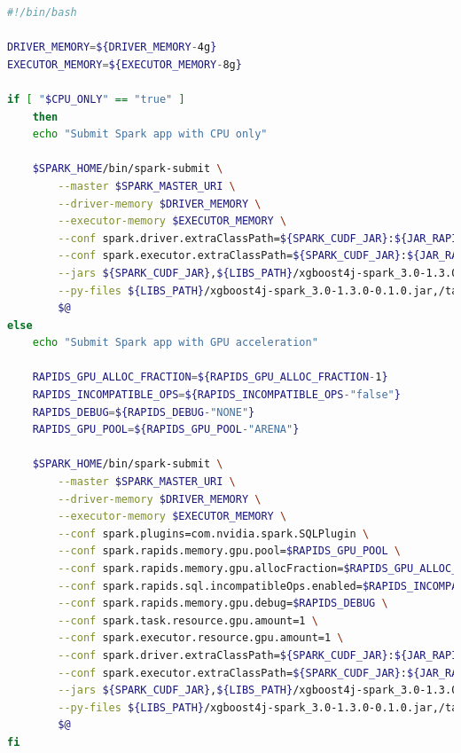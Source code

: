 \begin{lstlisting}[label=lst:appendix_spark-submit_script, caption=Custom submit script, language=sh]
#!/bin/bash
 
DRIVER_MEMORY=${DRIVER_MEMORY-4g}
EXECUTOR_MEMORY=${EXECUTOR_MEMORY-8g}
 
if [ "$CPU_ONLY" == "true" ]
    then
    echo "Submit Spark app with CPU only"
 
    $SPARK_HOME/bin/spark-submit \
        --master $SPARK_MASTER_URI \
        --driver-memory $DRIVER_MEMORY \
        --executor-memory $EXECUTOR_MEMORY \
        --conf spark.driver.extraClassPath=${SPARK_CUDF_JAR}:${JAR_RAPIDS}:${LIBS_PATH}/xgboost4j_3.0-1.3.0-0.1.0.jar:${LIBS_PATH}/xgboost4j-spark_3.0-1.3.0-0.1.0.jar \
        --conf spark.executor.extraClassPath=${SPARK_CUDF_JAR}:${JAR_RAPIDS}:${LIBS_PATH}/xgboost4j_3.0-1.3.0-0.1.0.jar:${LIBS_PATH}/xgboost4j-spark_3.0-1.3.0-0.1.0.jar \
        --jars ${SPARK_CUDF_JAR},${LIBS_PATH}/xgboost4j-spark_3.0-1.3.0-0.1.0.jar,${LIBS_PATH}/xgboost4j_3.0-1.3.0-0.1.0.jar,${JAR_RAPIDS} \
        --py-files ${LIBS_PATH}/xgboost4j-spark_3.0-1.3.0-0.1.0.jar,/tank/data/users/chh-ms/spark-xgboost-examples/examples/apps/python/samples.zip \
        $@
else
    echo "Submit Spark app with GPU acceleration"
 
    RAPIDS_GPU_ALLOC_FRACTION=${RAPIDS_GPU_ALLOC_FRACTION-1}
    RAPIDS_INCOMPATIBLE_OPS=${RAPIDS_INCOMPATIBLE_OPS-"false"}
    RAPIDS_DEBUG=${RAPIDS_DEBUG-"NONE"}
    RAPIDS_GPU_POOL=${RAPIDS_GPU_POOL-"ARENA"}
 
    $SPARK_HOME/bin/spark-submit \
        --master $SPARK_MASTER_URI \
        --driver-memory $DRIVER_MEMORY \
        --executor-memory $EXECUTOR_MEMORY \
        --conf spark.plugins=com.nvidia.spark.SQLPlugin \
        --conf spark.rapids.memory.gpu.pool=$RAPIDS_GPU_POOL \
        --conf spark.rapids.memory.gpu.allocFraction=$RAPIDS_GPU_ALLOC_FRACTION \
        --conf spark.rapids.sql.incompatibleOps.enabled=$RAPIDS_INCOMPATIBLE_OPS \
        --conf spark.rapids.memory.gpu.debug=$RAPIDS_DEBUG \
        --conf spark.task.resource.gpu.amount=1 \
        --conf spark.executor.resource.gpu.amount=1 \
        --conf spark.driver.extraClassPath=${SPARK_CUDF_JAR}:${JAR_RAPIDS}:${LIBS_PATH}/xgboost4j_3.0-1.3.0-0.1.0.jar:${LIBS_PATH}/xgboost4j-spark_3.0-1.3.0-0.1.0.jar \
        --conf spark.executor.extraClassPath=${SPARK_CUDF_JAR}:${JAR_RAPIDS}:${LIBS_PATH}/xgboost4j_3.0-1.3.0-0.1.0.jar:${LIBS_PATH}/xgboost4j-spark_3.0-1.3.0-0.1.0.jar \
        --jars ${SPARK_CUDF_JAR},${LIBS_PATH}/xgboost4j-spark_3.0-1.3.0-0.1.0.jar,${LIBS_PATH}/xgboost4j_3.0-1.3.0-0.1.0.jar,${JAR_RAPIDS} \
        --py-files ${LIBS_PATH}/xgboost4j-spark_3.0-1.3.0-0.1.0.jar,/tank/data/users/chh-ms/spark-xgboost-examples/examples/apps/python/samples.zip \
        $@  
fi
\end{lstlisting}

